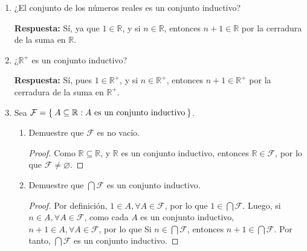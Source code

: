 \documentclass[11pt]{article}
\newcommand{\N}{\mathbb{N}}
\newcommand{\R}{\mathbb{R}}
\newcommand{\bfit}[1]{\textbf{\textit{#1}}}
\let\emptyset\varnothing
\let\set\Set
\let\subset\subseteq
\begin{document}
\begin{enumerate}[label=\arabic*)]
 \item ¿El conjunto de los números reales es un conjunto inductivo?
 
 \textbf{Respuesta:} Sí, ya que $1 \in \R$, y si $n\in \R$, entonces $n+1 \in \R$ por la cerradura de la suma en $\R$.


 \item ¿$\R^+$ es un conjunto inductivo?
 
 \textbf{Respuesta:} Sí, pues $1\in \R^+$, y si $n\in \R^+$, entonces $n+1 \in \R^+$ por la cerradura de la suma en $\R^+$.

 \item Sea $\mathcal{F}= \set{A\subset \R: \text{$A$ es un conjunto inductivo}}$.
 \begin{enumerate}[label=\alph*)]
 \item Demuestre que $\mathcal{F}$ es no vacío.
 \begin{proof}
  Como $\R \subset \R$, y $\R$ es un conjunto inductivo, entonces $\R \in \mathcal{F}$, por lo que $\mathcal{F} \neq \emptyset$.
 \end{proof}%
 \item Demuestre que $\bigcap \mathcal{F}$ es un conjunto inductivo.%
 \begin{proof}
 Por definición, $1\in A, \forall A\in \mathcal{F}$, por lo que $1\in \bigcap \mathcal{F}$. Luego, si $n\in A, \forall A\in \mathcal{F}$, como cada $A$ es un conjunto inductivo, $n+1\in A, \forall A\in \mathcal{F}$, por lo que Si $n \in \bigcap \mathcal{F}$, entonces $n+1 \in \bigcap \mathcal{F}$. Por tanto, $\bigcap \mathcal{F}$ es un conjunto inductivo.
 \end{proof}%
 \end{enumerate}

\end{enumerate}
%
\end{document}
